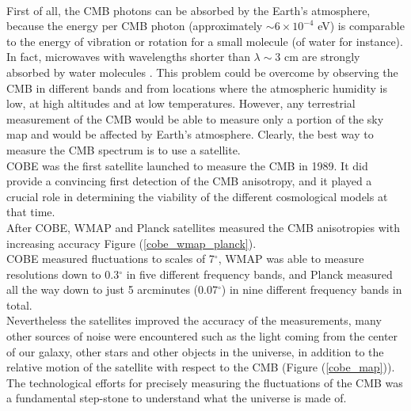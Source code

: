 \documentclass{article}
\begin{document}
\\
First of all, the CMB photons
can be absorbed by the Earth's atmosphere, because the energy per CMB photon (approximately $\sim 6 \times 10 ^{-4}$ eV) is comparable to the energy of vibration or rotation for a small molecule (of water for instance). 
In fact, microwaves with wavelengths shorter than $\lambda \sim 3$ cm are strongly absorbed by water molecules \citep{RydenIntroCosmoPdf}.
This problem could be overcome by observing the CMB in different bands and from locations where the atmospheric humidity is low, at high altitudes and at low temperatures.
However, any terrestrial measurement of the CMB would be able to measure only a portion of the sky map and would be affected by Earth's atmosphere. Clearly, the best way to measure the CMB spectrum is to use a satellite.\\
COBE was the first satellite launched to measure the CMB in 1989. 
It did provide a convincing first detection of the CMB anisotropy, and it played a crucial role in determining the viability of the different cosmological models at that time.
\\
After COBE, WMAP and Planck satellites measured the CMB anisotropies with increasing accuracy  Figure (\ref{cobe_wmap_planck}).\\
COBE measured fluctuations to scales of 7$^\circ$, WMAP was able to measure resolutions down to 0.3$^\circ$ in five different frequency bands, and Planck measured all the way down to just 5 arcminutes (0.07$^\circ$) in nine different frequency bands in total.\\
Nevertheless the satellites improved the accuracy of the measurements, many other sources of noise were encountered such as the light coming from the center of our galaxy, other stars and other objects in the universe, in addition to the relative motion of the satellite with respect to the CMB (Figure (\ref{cobe_map})).\\ 
The technological efforts for precisely measuring the fluctuations of the CMB was a fundamental step-stone to understand what the universe is made of.
\vspace{3cm}
\end{document}
